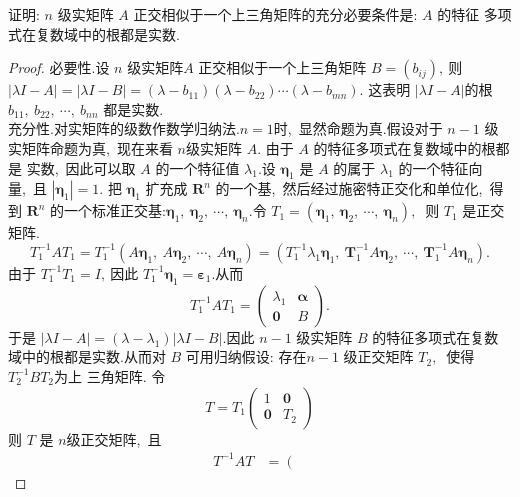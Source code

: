\newpage
\begin{problem}
	证明: $ n $ 级实矩阵  $A $ 正交相似于一个上三角矩阵的充分必要条件是:  $A $ 的特征 多项式在复数域中的根都是实数.
\end{problem}
\begin{proof}
	必要性.设 $ n$  级实矩阵$  A $ 正交相似于一个上三角矩阵 $ B=\left(b_{i j}\right) ,\  $则 $ |\lambda I-A|=|\lambda I-B|=\left(\lambda-b_{11}\right)\left(\lambda-b_{22}\right) \cdots\left(\lambda-b_{m n}\right) .$
	这表明 $ |\lambda I-A|  $的根$  b_{11},\  b_{22},\  \cdots,\  b_{nn} $ 都是实数.\\
	充分性.对实矩阵的级数作数学归纳法.$ n=1  $时,\  显然命题为真.假设对于 $ n-1 $ 级实矩阵命题为真,\  现在来看 $ n  $级实矩阵 $ A.$  由于  $A$  的特征多项式在复数域中的根都是 实数,\  因此可以取  $A $ 的一个特征值  $\lambda_{1} .$设 $ \boldsymbol{\eta}_{1} $ 是  $A $ 的属于  $\lambda_{1}$  的一个特征向量,\  且  $\left|\boldsymbol{\eta}_{1}\right|=1 .$ 把  $\boldsymbol{\eta}_{1} $ 扩充成  $\mathbf{R}^{n} $ 的一个基,\ 然后经过施密特正交化和单位化,\ 得到 $ \mathbf{R}^{n} $ 的一个标准正交基:$  \boldsymbol{\eta}_{1},\  \boldsymbol{\eta}_{2},\  \cdots,\  \boldsymbol{\eta}_{n} .$令 $ T_{1}=\left(\boldsymbol{\eta}_{1},\  \boldsymbol{\eta}_{2},\  \cdots,\  \boldsymbol{\eta}_{n}\right) ,\ $ 则 $ T_{1} $ 是正交矩阵.
	$$T_{1}^{-1} A T_{1}=T_{1}^{-1}\left(A \boldsymbol{\eta}_{1},\  A \boldsymbol{\eta}_{2},\  \cdots,\  A \boldsymbol{\eta}_{n}\right)=\left(T_{1}^{-1} \lambda_{1} \boldsymbol{\eta}_{1},\  \boldsymbol{T}_{1}^{-1} A \boldsymbol{\eta}_{2},\  \cdots,\  \boldsymbol{T}_{1}^{-1} A \boldsymbol{\eta}_{n}\right) .$$
	由于 $ T_{1}^{-1} T_{1}=I ,\  $因此  $T_{1}^{-1} \boldsymbol{\eta}_{1}=\boldsymbol{\varepsilon}_{1}  .$从而
	$$T_{1}^{-1} A T_{1}=\left(\begin{array}{cc}
		\lambda_{1} & \boldsymbol{\alpha} \\
		\mathbf{0} & B
	\end{array}\right) .$$
	于是 $ |\lambda I-A|=\left(\lambda-\lambda_{1}\right)|\lambda I-B| .$因此  $n-1 $ 级实矩阵  $B $ 的特征多项式在复数域中的根都是实数.从而对  $B $ 可用归纳假设: 存在$  n-1 $ 级正交矩阵 $ T_{2} ,\ $ 使得 $ T_{2}^{-1} B T_{2}  $为上 三角矩阵.
	令
	$$T=T_{1}\left(\begin{array}{cc}
		1 & \mathbf{0} \\
		\mathbf{0} & T_{2}
	\end{array}\right)$$
	则  $T $ 是 $ n  $级正交矩阵,\  且
	$$\begin{aligned}
		T^{-1} A T & =\left(\begin{array}{cc}

\end{array}
\end{aligned}$$
\end{proof}
